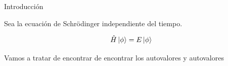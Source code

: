 \begin{frame}{Introducción}

	Sea la ecuación de Schrödinger independiente del tiempo.

	\[
		\hat{H} \ket{\phi} = E \ket{\phi}
	\]

	Vamos a tratar de encontrar de encontrar los autovalores y autovalores

\end{frame}
